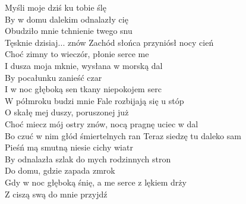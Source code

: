\begin{flushleft}
Myśli moje dziś ku tobie ślę\\
By w domu dalekim odnalazły cię\\
Obudziło mnie tchnienie twego snu\\
Tęsknie dzisiaj... znów
\hops
Zachód słońca przyniósł nocy cień\\
Choć zimny to wieczór, płonie serce me\\
I dusza moja mknie, wysłana w morską dal\\
By pocałunku zanieść czar
\hops
\hspace{0.9cm}\\
\hspace{0.9cm}I w noc głęboką sen tkany niepokojem serc\\
\hspace{0.9cm}W półmroku budzi mnie
\hops
Fale rozbijają się u stóp\\
O skałę mej duszy, poruszonej już\\
Choć miecz mój ostry znów, nocą pragnę uciec w dal\\
Bo czuć w nim głód śmiertelnych ran
\hops
Teraz siedzę tu daleko sam\\
Pieśń mą smutną niesie cichy wiatr\\
By odnalazła szlak do mych rodzinnych stron\\
Do domu, gdzie zapada zmrok
\hops
\hspace{0.9cm}\\
\hspace{0.9cm}Gdy w noc głęboką śnię, a me serce z lękiem drży\\
\hspace{0.9cm}Z ciszą swą do mnie przyjdź

\end{flushleft}
\newpage